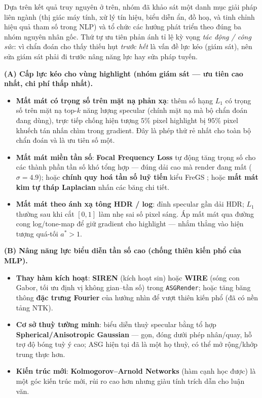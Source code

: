     Dựa trên kết quả truy nguyên ở trên, nhóm đã khảo sát một danh mục giải pháp liên
    ngành (thị giác máy tính, xử lý tín hiệu, biểu diễn ẩn, đồ hoạ, và tinh chỉnh hiệu
    quả tham số trong NLP) và tổ chức các hướng phát triển theo đúng ba nhóm nguyên
    nhân gốc. Thứ tự ưu tiên phản ánh tỉ lệ kỳ vọng \textit{tác động / công sức}: vì
    chẩn đoán cho thấy thiếu hụt \textit{trước hết} là vấn đề lực kéo (giám sát), nên
    sửa giám sát phải đi trước nâng năng lực hay sửa pháp tuyến.

    \textbf{(A) Cấp lực kéo cho vùng highlight (nhóm giám sát --- ưu tiên cao nhất, chi phí thấp nhất).}
    \begin{itemize}
        \item \textbf{Mất mát có trọng số trên mặt nạ phản xạ}: thêm số hạng $L_1$ có
        trọng số trên mặt nạ top-$k$ năng lượng specular (chính mặt nạ mà bộ chẩn đoán
        đang dùng), trực tiếp chống hiện tượng $5\%$ pixel highlight bị $95\%$ pixel
        khuếch tán nhấn chìm trong gradient. Đây là phép thử rẻ nhất cho toàn bộ chẩn
        đoán và là ưu tiên số một.
        \item \textbf{Mất mát miền tần số}: \textbf{Focal Frequency Loss}
        \cite{focalfreq} tự động tăng trọng số cho các thành phần tần số khó tổng hợp
        --- đúng dải cao mà render đang mất ($\sigma=4.9$); hoặc \textbf{chính quy hoá
        tần số luỹ tiến} kiểu FreGS \cite{fregs}; hoặc \textbf{mất mát kim tự tháp
        Laplacian} \cite{lapsrn} nhấn các băng chi tiết.
        \item \textbf{Mất mát theo ánh xạ tông HDR / log}: đỉnh specular gần dải HDR;
        $L_1$ thường sau khi cắt $[0,1]$ làm nhẹ sai số pixel sáng. Áp mất mát qua
        đường cong log/tone-map \cite{rawnerf} để giữ gradient cho highlight --- nhắm
        thẳng vào hiện tượng quá-tối $a^*>1$.
    \end{itemize}

    \textbf{(B) Nâng năng lực biểu diễn tần số cao (chống thiên kiến phổ của MLP).}
    \begin{itemize}
        \item \textbf{Thay hàm kích hoạt}: \textbf{SIREN} \cite{siren} (kích hoạt sin)
        hoặc \textbf{WIRE} \cite{wire} (sóng con Gabor, tối ưu định vị không gian--tần
        số) trong \texttt{ASGRender}; hoặc tăng băng thông \textbf{đặc trưng Fourier}
        \cite{fourierfeat} của hướng nhìn để vượt thiên kiến phổ (đã có nền tảng NTK).
        \item \textbf{Cơ sở thuỳ tường minh}: biểu diễn thuỳ specular bằng tổ hợp
        \textbf{Spherical/Anisotropic Gaussian} \cite{physg} --- gọn, đóng dưới phép
        nhân/quay, hỗ trợ độ bóng tuỳ ý cao; ASG hiện tại đã là một họ thuỳ, có thể
        mở rộng/khớp trung thực hơn.
        \item \textbf{Kiến trúc mới}: \textbf{Kolmogorov--Arnold Networks}
        \cite{kan} (hàm cạnh học được) là một góc kiến trúc mới, rủi ro cao hơn nhưng
        giàu tính trích dẫn cho luận văn.
    \end{itemize}

